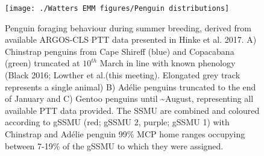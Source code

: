 \documentclass[]{elsarticle} %
\begin{document}
\begin{figure}
\texttt{[image: ./Watters EMM figures/Penguin distributions]} \caption{Penguin foraging behaviour during summer breeding, derived from available ARGOS-CLS PTT data presented in Hinke et al. 2017. A) Chinstrap penguins from Cape Shireff (blue) and Copacabana (green) truncated at $10^{th}$ March in line with known phenology (Black 2016; Lowther et al.(this meeting).  Elongated grey track represents a single animal) B) Adélie penguins truncated to the end of January and C) Gentoo penguins until \textasciitilde{}August, representing all available PTT data provided. The SSMU are combined and coloured according to gSSMU (red; gSSMU 2, purple; gSSMU 1) with Chinstrap and Adélie penguin 99\% MCP home ranges occupying between 7-19\% of the gSSMU to which they were assigned.}\label{fig:Penguin distribution plots}
\end{figure}
\end{document}
